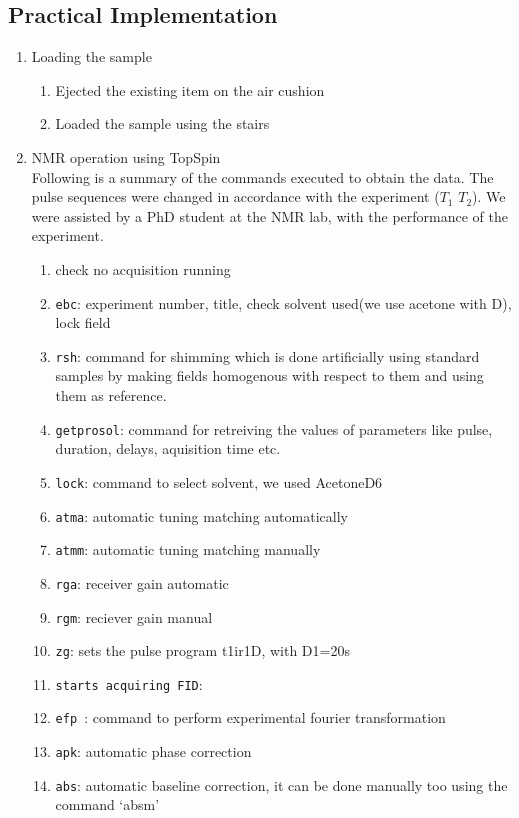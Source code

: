 	\subsection{Practical Implementation}
		\begin{enumerate}
			\item Loading the sample
				\begin{enumerate}
					\item Ejected the existing item on the air cushion
					\item Loaded the sample using the stairs
				\end{enumerate}
			\item NMR operation using TopSpin \\
				Following is a summary of the commands executed to obtain the data. The pulse sequences were changed in accordance with the experiment ($T_1$ $T_2$). We were assisted by a PhD student at the NMR lab, with the performance of the experiment.
				\begin{enumerate}
					\item check no acquisition running
					\item \texttt{ebc}:
					experiment number, title, check solvent used(we use acetone with D), lock field
					\item \texttt{rsh}:
					command for shimming which is done artificially using standard samples by making fields homogenous with respect to them and using them as reference.
					\item \texttt{getprosol}:
					command for retreiving the values of parameters like pulse, duration, delays, aquisition time etc.
					\item \texttt{lock}:
					command to select solvent, we used AcetoneD6
					\item \texttt{atma}:
					automatic tuning matching automatically 
					\item \texttt{atmm}:
					automatic tuning matching manually 
					\item \texttt{rga}:
					receiver gain automatic
					\item \texttt{rgm}:
					reciever gain manual
					\item \texttt{zg}:
					sets the pulse program t1ir1D, with D1=20s
					\item \texttt{starts acquiring FID}:
					\item \texttt{efp }:
					command to perform experimental fourier transformation 
					\item \texttt{apk}:
					automatic phase correction
					\item \texttt{abs}:
					automatic baseline correction, it can be done manually too using the command `absm'
				\end{enumerate}
			\end{enumerate}

